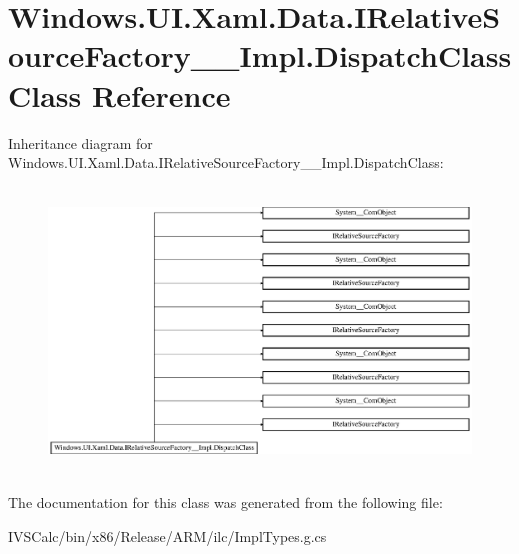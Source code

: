 \hypertarget{class_windows_1_1_u_i_1_1_xaml_1_1_data_1_1_i_relative_source_factory_____impl_1_1_dispatch_class}{}\section{Windows.\+U\+I.\+Xaml.\+Data.\+I\+Relative\+Source\+Factory\+\_\+\+\_\+\+Impl.\+Dispatch\+Class Class Reference}
\label{class_windows_1_1_u_i_1_1_xaml_1_1_data_1_1_i_relative_source_factory_____impl_1_1_dispatch_class}
Inheritance diagram for Windows.\+U\+I.\+Xaml.\+Data.\+I\+Relative\+Source\+Factory\+\_\+\+\_\+\+Impl.\+Dispatch\+Class\+:\begin{figure}[H]
\begin{center}
\leavevmode
\includegraphics[height=7.623762cm]{class_windows_1_1_u_i_1_1_xaml_1_1_data_1_1_i_relative_source_factory_____impl_1_1_dispatch_class}
\end{center}
\end{figure}


The documentation for this class was generated from the following file\+:\begin{DoxyCompactItemize}
\item 
I\+V\+S\+Calc/bin/x86/\+Release/\+A\+R\+M/ilc/Impl\+Types.\+g.\+cs\end{DoxyCompactItemize}
